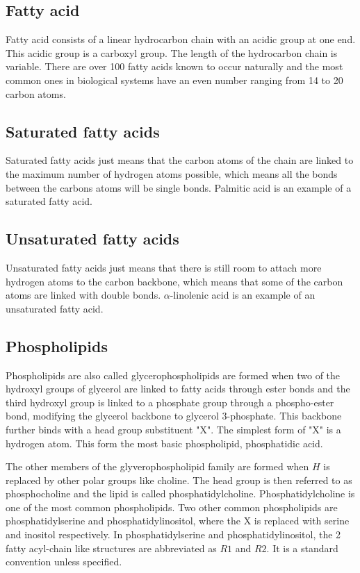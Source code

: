 \documentclass[11pt]{article}
\begin{document}
\subsection{Fatty acid}
\label{sec:org80e7272}
Fatty acid consists of a linear hydrocarbon chain with an acidic group at one end. This acidic group is a carboxyl group. The length of the hydrocarbon chain is variable. There are over 100 fatty acids known to occur naturally and the most common ones in biological systems have an even number ranging from 14 to 20 carbon atoms.
\subsection{Saturated fatty acids}
\label{sec:org17eaa5a}
Saturated fatty acids just means that the carbon atoms of the chain are linked to the maximum number of hydrogen atoms possible, which means all the bonds between the carbons atoms will be single bonds. Palmitic acid is an example of a saturated fatty acid.
\subsection{Unsaturated fatty acids}
\label{sec:orga51d0cf}
Unsaturated fatty acids just means that there is still room to attach more hydrogen atoms to the carbon backbone, which means that some of the carbon atoms are linked with double bonds. \(\alpha\)-linolenic acid is an example of an unsaturated fatty acid.
\subsection{Phospholipids}
\label{sec:orgc84d7f8}
Phospholipids are also called glycerophospholipids are formed when two of the hydroxyl groups of glycerol are linked to fatty acids through ester bonds and the third hydroxyl group is linked to a phosphate group through a phospho-ester bond, modifying the glycerol backbone to glycerol 3-phosphate. This backbone further binds with a head group substituent "X". The simplest form of "X" is a hydrogen atom. This form the most basic phospholipid, phosphatidic acid.


The other members of the glyverophospholipid family are formed when \(H\) is replaced by other polar groups like choline. The head group is then referred to as phosphocholine and the lipid is called phosphatidylcholine. Phosphatidylcholine is one of the most common phospholipids. Two other common phospholipids are phosphatidylserine and phosphatidylinositol, where the X is replaced with serine and inositol respectively. In phosphatidylserine and phosphatidylinositol, the 2 fatty acyl-chain like structures are abbreviated as \(R1\) and \(R2\). It is a standard convention unless specified.
\end{document}

